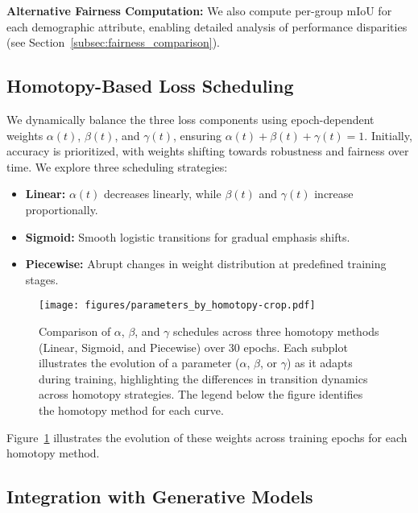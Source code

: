 \textbf{Alternative Fairness Computation:} We also compute per-group \(\mathrm{mIoU}\) for each demographic attribute, enabling detailed analysis of performance disparities (see Section~\ref{subsec:fairness_comparison}).

\subsection{Homotopy-Based Loss Scheduling}
\label{subsec:homotopy}

We dynamically balance the three loss components using epoch-dependent weights \(\alpha(t)\), \(\beta(t)\), and \(\gamma(t)\), ensuring \(\alpha(t) + \beta(t) + \gamma(t) = 1\). Initially, accuracy is prioritized, with weights shifting towards robustness and fairness over time. We explore three scheduling strategies:

\begin{itemize}
    \item \textbf{Linear:} \(\alpha(t)\) decreases linearly, while \(\beta(t)\) and \(\gamma(t)\) increase proportionally.
    \item \textbf{Sigmoid:} Smooth logistic transitions for gradual emphasis shifts.
    \item \textbf{Piecewise:} Abrupt changes in weight distribution at predefined training stages.
\end{itemize}

\begin{figure}[t]
    \centering
    \texttt{[image: figures/parameters\_by\_homotopy-crop.pdf]}
    \caption{Comparison of \(\alpha\), \(\beta\), and \(\gamma\) schedules across three homotopy methods (Linear, Sigmoid, and Piecewise) over 30 epochs. Each subplot illustrates the evolution of a parameter (\(\alpha\), \(\beta\), or \(\gamma\)) as it adapts during training, highlighting the differences in transition dynamics across homotopy strategies. The legend below the figure identifies the homotopy method for each curve.}
    \label{fig:homotopy-schedules}
\end{figure}


Figure~\ref{fig:homotopy-schedules} illustrates the evolution of these weights across training epochs for each homotopy method.

\subsection{Integration with Generative Models}


